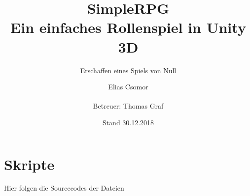 \documentclass[a4paper,openright]{scrreprt} %
\title{SimpleRPG \\
 Ein einfaches Rollenspiel in Unity 3D}
\subtitle{Erschaffen eines Spiels von Null}
\author{\texorpdfstring{Elias Csomor\\[1cm]\\[1cm] {\small Betreuer: Thomas Graf}}{Hans Muster}}
\date{\small Stand 30.12.2018}
\begin{document}
\maketitle %
\cleardoublepage
{} %
\tableofcontents %
\cleardoublepage %











\chapter{Skripte}

Hier folgen die Sourcecodes der Dateien 
% 
\listoffigures %
%
\printbibliography[title=Quellenverzeichnis]
\end{document}

